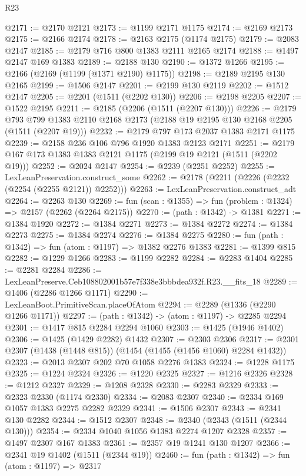 \begin{lexlean}{R23}
\begin{coremodule}
@2171 := @2170 @2121
@2173 := @1199 @2171 @1175
@2174 := @2169 @2173
@2175 := @2166 @2174
@2178 := @2163 @2175 (@1174 @2175)
@2179 := @2083 @2147
@2185 := @2179 @716 @800 @1383 @2111 @2165 @2174
@2188 := @1497 @2147 @169 @1383
@2189 := @2188 @130
@2190 := @1372 @1266
@2195 := @2166 (@2169 (@1199 (@1371 @2190) @1175))
@2198 := @2189 @2195 @130 @2165
@2199 := @1506 @2147
@2201 := @2199 @130 @2119
@2202 := @1512 @2147
@2205 := @2201 (@1511 (@2202 @130))
@2206 := @2198 @2205
@2207 := @1522 @2195
@2211 := @2185 (@2206 (@1511 (@2207 @130)))
@2226 := @2179
    @793
    @799
    @1383
    @2110
    @2168
    @2173
    (@2188 @19 @2195 @130 @2168 @2205 (@1511 (@2207 @19)))
@2232 := @2179 @797 @173 @2037 @1383 @2171 @1175
@2239 := @2158 @236 @106 @796 @1920 @1383 @2123 @2171
@2251 := @2179 @167 @173 @1383 @1383 @2121 @1175 (@2199 @19 @2121 (@1511 (@2202 @19)))
@2252 := @2024 @2147
@2254 := @2239 (@2251 @2252)
@2255 := LexLeanPreservation.construct_some
@2262 := @2178 (@2211 (@2226 (@2232 (@2254 (@2255 @2121)) @2252)))
@2263 := LexLeanPreservation.construct_adt
@2264 := @2263 @130
@2269 := fun (scan : @1355) => fun (problem : @1324) => @2157 (@2262 (@2264 @2175))
@2270 := (path : @1342) -> @1381
@2271 := @1384 @1920
@2272 := @1384 @2271
@2273 := @1384 @2272
@2274 := @1384 @2273
@2275 := @1384 @2274
@2276 := @1384 @2275
@2280 := fun (path : @1342) => fun (atom : @1197) => @1382 @2276 @1383
@2281 := @1399 @815
@2282 := @1229 @1266
@2283 := @1199 @2282
@2284 := @2283 @1404
@2285 := @2281 @2284
@2286 := LexLeanPreserve.Ceb108802001b57e7f338e3bbbdea932f.R23.__fits_18
@2289 := @1406 (@2286 @1266 @1171)
@2290 := LexLeanBoot.PrimitiveScan.placeOfAtom
@2294 := @2289 (@1336 (@2290 @1266 @1171))
@2297 := (path : @1342) -> (atom : @1197) -> @2285 @2294
@2301 := @1417 @815 @2284 @2294 @1060
@2303 := @1425 (@1946 @1402)
@2306 := @1425 (@1429 @2282) @1432
@2307 := @2303 @2306
@2317 := @2301 @2307 (@1438 (@1448 @815)) (@1454 (@1455 (@1456 @1060) @2284 @1432))
@2323 := @2013 @2307 @202 @70 @1058 @2276 @1383
@2324 := @1228 @1175
@2325 := @1224 @2324
@2326 := @1220 @2325
@2327 := @1216 @2326
@2328 := @1212 @2327
@2329 := @1208 @2328
@2330 := @2283 @2329
@2333 := @2323 @2330 (@1174 @2330)
@2334 := @2083 @2307
@2340 := @2334 @169 @1057 @1383 @2275 @2282 @2329
@2341 := @1506 @2307
@2343 := @2341 @130 @2282
@2344 := @1512 @2307
@2348 := @2340 (@2343 (@1511 (@2344 @130)))
@2354 := @2334 @1040 @1056 @1383 @2274 @1207 @2328
@2357 := @1497 @2307 @167 @1383
@2361 := @2357 @19 @1241 @130 @1207
@2366 := @2341 @19 @1402 (@1511 (@2344 @19))
@2460 := fun (path : @1342) =>
  fun (atom : @1197) =>
  @2317

\end{coremodule}
\end{lexlean}
